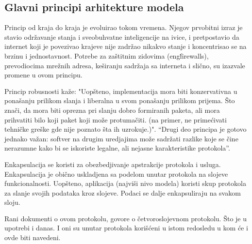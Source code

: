 \documentclass[a4paper,12pt, master]{etf}
\begin{document}
	\subsection{Glavni principi arhitekture modela}

	Princip od kraja do kraja je evoluirao tokom vremena. Njegov prvobitni
	izraz je stavio	odr\v{z}avanje stanja i sveobuhvatne inteligencije na ivice,
	 i pretpostavio da internet koji je	povezivao krajeve nije zadr\v{z}ao
	nikakvo stanje i koncentrisao se na brzinu i jednostavnost. Potrebe za
	za\v{s}titnim zidovima (eng\. firewalls), prevodiocima mre\v{z}nih adresa,
    ke\v{s}iranju sadr\v{z}aja sa interneta i sli\v{c}no, su izazvale promene u
    ovom principu.

	Princip robusnosti ka\v{z}e: "Uop\v{s}teno, implementacija mora biti
	konzervativna u pona\v{s}anju prilikom slanja i liberalna u svom
	pona\v{s}anju prilikom prijema. \v{S}to zna\v{c}i, da mora biti
	oprezna pri slanju dobro formiranih paketa, ali mora prihvatiti bilo koji
    paket koji mo\v{z}e protuma\v{c}iti. (na primer, ne prime\'{c}ivati
    tehni\v{c}ke gre\v{s}ke gde nije poznato \v{s}ta ih uzrokuje.)". ``Drugi deo
    principa je gotovo jednako va\v{z}an: softver na drugim uredjajima mo\v{z}e
    sadr\v{z}ati razlike koje se \v{c}ine nerazumne kako bi se iskoriste
    legalne, ali nejasne karakteristike protokola''.

	Enkapsulacija se koristi za obezbedjivanje apstrakcije protokola i usluga.
	Enkapsulacija je obi\v{c}no uskladjena sa podelom unutar protokola na
	slojeve funkcionalnosti. Uop\v{s}teno, aplikacija (najvi\v{s}i nivo modela)
	koristi skup protokola za slanje svojih podataka kroz slojeve. Podaci se
	dalje enkapsuliraju na svakom sloju.

	Rani dokumenti o ovom protokolu, govore o \v{c}etvoroslojevnom protokolu.
	\v{S}to je u upotrebi i	danas. I oni su unutar protokola kori\v{s}\'{c}eni
	u istom redosledu u kom \'{c}e i ovde biti navedeni.
\end{document}
